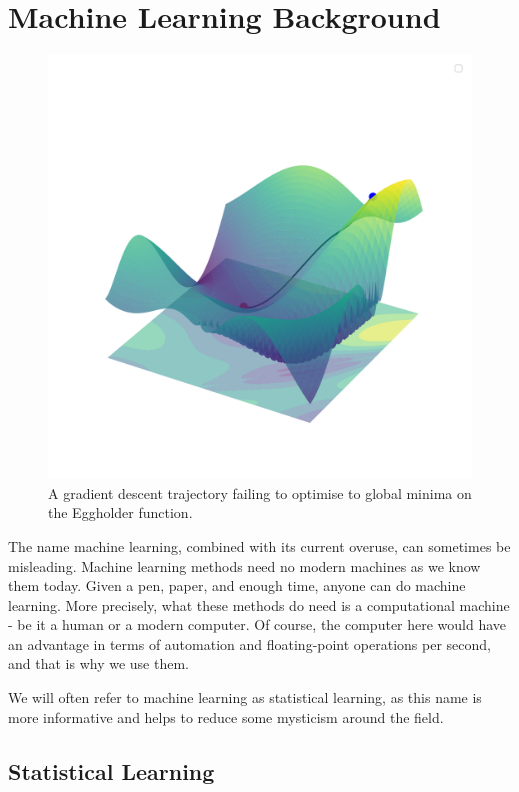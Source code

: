 \chapter{Machine Learning Background}\label{chap:ml}

\begin{figure}[h]
    \centering
    \includegraphics[width=0.8\linewidth]{Chapters/Theoretical_Background/images/eggholder.pdf}
    \caption{A gradient descent trajectory failing to optimise to global minima on the Eggholder function.}
    \label{fig:eggholder}
\end{figure}

The name machine learning, combined with its current overuse, can sometimes be misleading. Machine learning methods need no modern machines as we know them today. Given a pen, paper, and enough time, anyone can do machine learning. More precisely, what these methods do need is a computational machine - be it a human or a modern computer. Of course, the computer here would have an advantage in terms of automation and floating-point operations per second, and that is why we use them.

We will often refer to machine learning as statistical learning, as this name is more informative and helps to reduce some mysticism around the field.

\blindmathtrue
\section{Statistical Learning}

